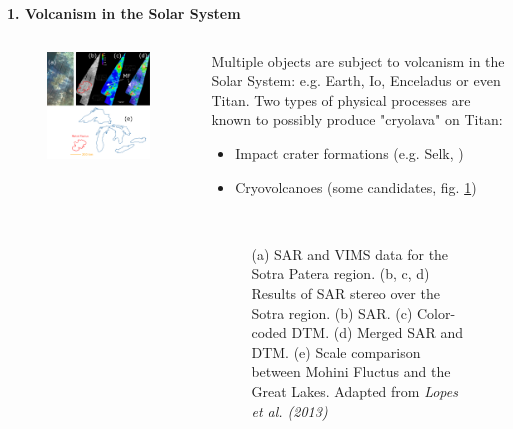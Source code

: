 \documentclass[final,t]{beamer}
\let\olditem\item
\renewcommand\item{\olditem\justifying}
\begin{document}
\begin{frame}
\begin{columns}[t]
\begin{column}{.495\linewidth}
  
  \begin{block}{\textbf{1. Volcanism in the Solar System}}\rightskip=0pt\leftskip=0pt
  \begin{columns}
  \begin{column}{0.495\textwidth}\rightskip=0pt\leftskip=0pt
  \begin{figure}
  	\centering
  	\includegraphics[scale=0.4]{Fig-Lopes-Dim-2013.png} 
  \end{figure}
  \end{column}
  \begin{column}{0.495\textwidth}\rightskip=0pt\leftskip=0pt
  Multiple objects are subject to volcanism in the Solar System: e.g. Earth, Io, Enceladus or even Titan.
  Two types of physical processes are known to possibly produce "cryolava" on Titan:
  \begin{itemize}
  	\item Impact crater formations (e.g. Selk, \cite{Neish})
  	\item Cryovolcanoes (some candidates, fig. \ref{fig:MohiniFluctus})
  \end{itemize}
  
  ~
  
  \begin{figure}
  	\caption{(a) SAR and VIMS data for the Sotra Patera region. (b, c, d) Results of SAR stereo over the Sotra region. (b) SAR. (c) Color-coded DTM. (d) Merged SAR and DTM. (e) Scale comparison between Mohini Fluctus and the Great Lakes. Adapted from \emph{Lopes et al. (2013)} \cite{Lopes2013}}
  	\label{fig:MohiniFluctus}
  \end{figure}
  \end{column}
  \end{columns}
  \end{block}
  

\end{column}
\end{columns}
\end{frame}
\end{document}
